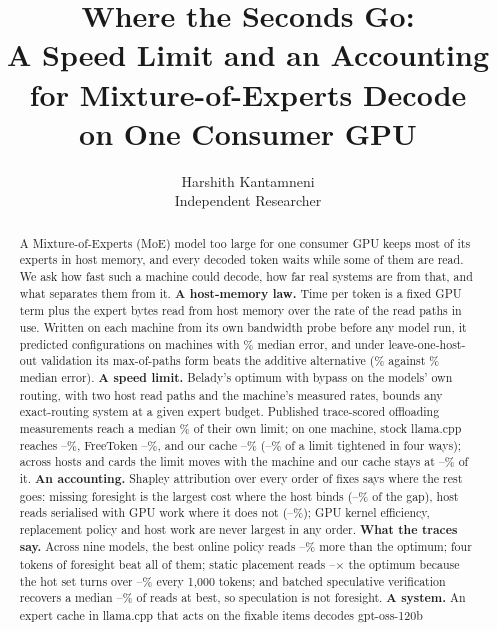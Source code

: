 \documentclass[10pt,twocolumn]{article}
\title{Where the Seconds Go:\\[2pt]\large A Speed Limit and an Accounting for Mixture-of-Experts Decode\\ on One Consumer GPU}
\author{Harshith Kantamneni\\Independent Researcher}
\date{}
\begin{document}
\maketitle

\begin{abstract}
A Mixture-of-Experts (MoE) model too large for one consumer GPU keeps most of its experts in host memory, and every
decoded token waits while some of them are read. We ask how fast such a machine could decode, how far real systems
are from that, and what separates them from it.
\textbf{A host-memory law.} Time per token is a fixed GPU term plus the expert bytes read from host memory over the
rate of the read paths in use. Written on each machine from its own bandwidth probe before any model run, it
predicted \lawCfg{} configurations on \lawHosts{} machines with \lawMedian\% median error, and under leave-one-host-out
validation its max-of-paths form beats the additive alternative (\lohoMaxMed\% against \lohoAddMed\% median error).
\textbf{A speed limit.} Belady's optimum with bypass on the models' own routing, with two host read paths and the
machine's measured rates, bounds any exact-routing system at a given expert budget. Published trace-scored offloading
measurements reach a median \audTraceMed\% of their own limit; on one machine, stock llama.cpp reaches
\llLimExPctMin--\llLimExPctMax\%, FreeToken \ftLimExPctMin--\ftLimExPctMax\%, and our cache
\limExPctMin--\limExPctMax\% (\limAllPctMin--\limAllPctMax\% of a limit tightened in four ways); across
\grHostsN{} hosts and \grCardsN{} cards the limit moves with the machine and our cache stays at
\grFracMin--\grFracMax\% of it.
\textbf{An accounting.} Shapley attribution over every order of fixes says where the rest goes: missing foresight is
the largest cost where the host binds (\shFsHostMin--\shFsHostMax\% of the gap), host reads serialised with GPU
work where it does not (\shOvlGpuMin--\shOvlGpuMax\%); GPU kernel efficiency, replacement policy and host work are
never largest in any order.
\textbf{What the traces say.} Across nine models, the best online policy reads \polBestOnlineMin--\polBestOnlineMax\%
more than the optimum; four tokens of foresight beat all of them; static placement reads
\polStaticMin--\polStaticMax$\times$ the optimum because the hot set turns over
\driftThousandMin--\driftThousandMax\% every 1{,}000 tokens; and batched speculative verification recovers a median
\bkFreeMin--\bkFreeMax\% of reads at best, so speculation is not foresight.
\textbf{A system.} An expert cache in llama.cpp that acts on the fixable items decodes gpt-oss-120b

\end{abstract}
\end{document}
